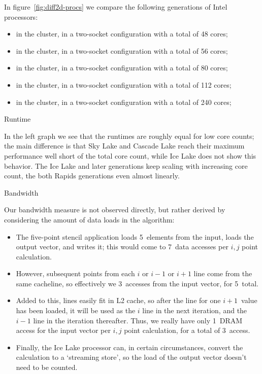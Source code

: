 In figure~\ref{fig:diff2d-procs} we compare the following generations of Intel processors:
\begin{itemize}
\item {} in the  cluster,
  in a two-socket configuration with a total of 48 cores;
\item {} in the  cluster,
  in a two-socket configuration with a total of 56 cores;
\item {} in the  cluster,
  in a two-socket configuration with a total of 80 cores;
\item {} in the  cluster,
  in a two-socket configuration with a total of 112 cores;
\item {} in the  cluster,
  in a two-socket configuration with a total of 240 cores;
\end{itemize}

 {Runtime}

In the left graph we see that the runtimes are roughly equal for low core counts;
the main difference is that Sky Lake and Cascade Lake reach their maximum performance
well short of the total core count, while Ice Lake does not show this behavior.
The Ice Lake and later generations keep scaling with increasing core count,
the both Rapids generations even almost linearly.

 {Bandwidth}

Our bandwidth measure is not observed directly, but
rather derived by considering the amount of data loads
in the algorithm:
\begin{itemize}
\item The five-point stencil application loads 5~elements from the input,
  loads the output vector, and writes it; this would come to 7~data accesses per
  $i,j$ point calculation.
\item However, subsequent points from each $i$ or $i-1$ or $i+1$ line
  come from the same cacheline, so effectively we 3~accesses from the input vector,
  for 5~total.
\item Added to this, lines easily fit in L2 cache, so after the line for one
  $i+1$~value has been loaded, it will be used as the $i$ line
  in the next iteration, and the $i-1$ line in the iteration thereafter.
  Thus, we really have only 1~DRAM access for the input vector per $i,j$ point calculation,
  for a total of 3~access.
\item Finally, the Ice Lake processor can, in certain circumstances,
  convert the calculation to a `streaming store', so the load of the output vector
  doesn't need to be counted.
\end{itemize}


